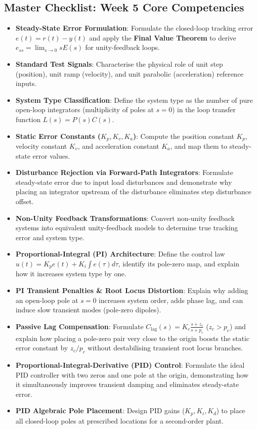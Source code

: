 \documentclass[12pt,onecolumn,twoside ]{article}
\begin{document}
	\subsection{Master Checklist: Week 5 Core Competencies}
	\begin{itemize}
		\item[$\square$]
		\textbf{Steady-State Error Formulation}: Formulate the closed-loop tracking error $e(t) = r(t) - y(t)$ and apply the \textbf{Final Value Theorem} to derive $e_{ss} = \lim_{s \to 0} s E(s)$ for unity-feedback loops.
		\item[$\square$]
		\textbf{Standard Test Signals}: Characterise the physical role of unit step (position), unit ramp (velocity), and unit parabolic (acceleration) reference inputs.
		\item[$\square$]
		\textbf{System Type Classification}: Define the system type as the number of pure open-loop integrators (multiplicity of poles at $s = 0$) in the loop transfer function $L(s) = P(s)C(s)$.
		\item[$\square$]
		\textbf{Static Error Constants ($K_p, K_v, K_a$)}: Compute the position constant $K_p$, velocity constant $K_v$, and acceleration constant $K_a$, and map them to steady-state error values.
		\item[$\square$]
		\textbf{Disturbance Rejection via Forward-Path Integrators}: Formulate steady-state error due to input load disturbances and demonstrate why placing an integrator upstream of the disturbance eliminates step disturbance offset.
		\item[$\square$]
		\textbf{Non-Unity Feedback Transformations}: Convert non-unity feedback systems into equivalent unity-feedback models to determine true tracking error and system type.
		\item[$\square$]
		\textbf{Proportional-Integral (PI) Architecture}: Define the control law $u(t) = K_p e(t) + K_i \int e(\tau) d\tau$, identify its pole-zero map, and explain how it increases system type by one.
		\item[$\square$]
		\textbf{PI Transient Penalties \& Root Locus Distortion}: Explain why adding an open-loop pole at $s = 0$ increases system order, adds phase lag, and can induce slow transient modes (pole-zero dipoles).
		\item[$\square$]
		\textbf{Passive Lag Compensation}: Formulate $C_{\text{lag}}(s) = K_c \frac{s + z_c}{s + p_c}$ ($z_c > p_c$) and explain how placing a pole-zero pair very close to the origin boosts the static error constant by $z_c / p_c$ without destabilising transient root locus branches.
		\item[$\square$]
		\textbf{Proportional-Integral-Derivative (PID) Control}: Formulate the ideal PID controller with two zeros and one pole at the origin, demonstrating how it simultaneously improves transient damping and eliminates steady-state error.
		\item[$\square$]
		\textbf{PID Algebraic Pole Placement}: Design PID gains ($K_p, K_i, K_d$) to place all closed-loop poles at prescribed locations for a second-order plant.
	\end{itemize}
	
\end{document}
